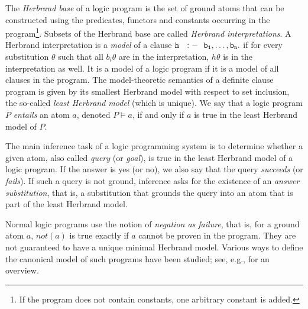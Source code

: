 \documentclass[a4paper]{article}
\begin{document}
The \emph{Herbrand base} of a logic program is the set of ground atoms that can be constructed using the predicates, functors and constants occurring in the program\footnote{If the program does not contain constants, one arbitrary constant is added.}. Subsets of the Herbrand base are called \emph{Herbrand interpretations}. A Herbrand interpretation is a \emph{model} of a clause $\mathtt{h ~~:- ~~b_1,\ldots ,b_n\ldotp}$ if for every substitution $\theta$ such that all $b_i\theta$ are in the interpretation, $h\theta$ is in the interpretation as well. It is a model of a logic program if it is a model of all clauses in the program. The model-theoretic semantics of a definite clause program is given by its smallest Herbrand model with respect to set inclusion, the so-called \emph{least Herbrand model} (which is unique). We say that a logic program $P$ \emph{entails} an atom $a$, denoted $P\models a$, if and only if $a$ is true in the least Herbrand model of $P$.   

The main inference task of a logic programming system is to determine
whether a given atom, also called \emph{query} (or \emph{goal}), is true in the least
Herbrand model of a logic program. If the answer is yes (or no), we also say that the query \emph{succeeds} (or \emph{fails}). If such a query is not ground, inference asks for the existence of an \emph{answer substitution}, that is, a substitution that grounds the query into an atom that is part of the least Herbrand model. 



Normal logic programs use the notion of \emph{negation as failure}, that is, for a ground atom $a$, $not(a)$ is true exactly if $a$ cannot be proven in the program. They are not guaranteed to have a unique minimal Herbrand model. Various ways to define the canonical model of such programs have been studied; see, e.g., \cite[Chapter 3]{lloyd:book89} for an overview. 
\end{document}
